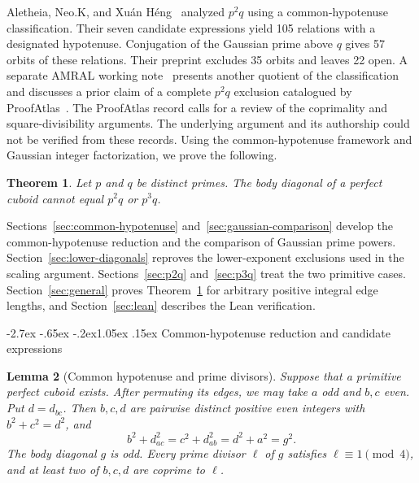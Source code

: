 \documentclass[11pt,a4paper,twoside]{article}
\makeatletter
\numberwithin{equation}{section}
\newtheorem{theorem}{Theorem}[section]
\newtheorem{lemma}[theorem]{Lemma}
\renewcommand{\section}{\@startsection{section}{1}{\z@}%
  {-2.7ex \@plus -.65ex \@minus -.2ex}{1.05ex \@plus .15ex}%
  {\normalfont\large\bfseries}}
\makeatother
\begin{document}
Aletheia, Neo.K, and Xuán Héng~\cite{ref2} analyzed \(p^2q\) using a common-hypotenuse classification. Their seven candidate expressions yield 105 relations with a designated hypotenuse. Conjugation of the Gaussian prime above \(q\) gives 57 orbits of these relations. Their preprint excludes 35 orbits and leaves 22 open. A separate AMRAL working note~\cite{ref3} presents another quotient of the classification and discusses a prior claim of a complete \(p^2q\) exclusion catalogued by ProofAtlas~\cite{ref4}. The ProofAtlas record calls for a review of the coprimality and square-divisibility arguments. The underlying argument and its authorship could not be verified from these records. Using the common-hypotenuse framework and Gaussian integer factorization, we prove the following.

\begin{theorem}\label{thm:main}
Let \(p\) and \(q\) be distinct primes. The body diagonal of a perfect cuboid cannot equal \(p^2q\) or \(p^3q\).
\end{theorem}

Sections~\ref{sec:common-hypotenuse} and~\ref{sec:gaussian-comparison} develop the common-hypotenuse reduction and the comparison of Gaussian prime powers. Section~\ref{sec:lower-diagonals} reproves the lower-exponent exclusions used in the scaling argument. Sections~\ref{sec:p2q} and~\ref{sec:p3q} treat the two primitive cases. Section~\ref{sec:general} proves Theorem~\ref{thm:main} for arbitrary positive integral edge lengths, and Section~\ref{sec:lean} describes the Lean verification.

\section{Common-hypotenuse reduction and candidate expressions}
\label{sec:common-hypotenuse}

\begin{lemma}[Common hypotenuse and prime divisors]
\label{lem:common-hypotenuse}
Suppose that a primitive perfect cuboid exists. After permuting its edges, we may take \(a\) odd and \(b,c\) even. Put \(d=d_{bc}\). Then \(b,c,d\) are pairwise distinct positive even integers with \(b^2+c^2=d^2\), and
\[
b^2+d_{ac}^2=c^2+d_{ab}^2=d^2+a^2=g^2.
\]
The body diagonal \(g\) is odd. Every prime divisor \(\ell\) of \(g\) satisfies \(\ell\equiv1\pmod 4\), and at least two of \(b,c,d\) are coprime to \(\ell\).
\end{lemma}
\end{document}
